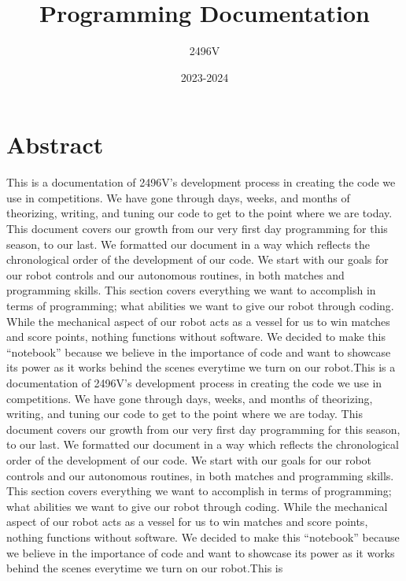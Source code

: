 \documentclass{article}
\title{\textbf{Programming Documentation}}
\author{2496V}
\date{2023-2024}
\begin{document}
\maketitle

\newpage
\renewcommand*\contentsname{Table of Contents}
\tableofcontents

\twocolumn \section{Abstract}
This is a documentation of 2496V’s development process in creating the code we use in competitions. We have gone through days, weeks, and months of theorizing, writing, and tuning our code to get to the point where we are today. This document covers our growth from our very first day programming for this season, to our last. We formatted our document in a way which reflects the chronological order of the development of our code. We start with our goals for our robot controls and our autonomous routines, in both matches and programming skills. This section covers everything we want to accomplish in terms of programming; what abilities we want to give our robot through coding. While the mechanical aspect of our robot acts as a vessel for us to win matches and score points, nothing functions without software. We decided to make this “notebook” because we believe in the importance of code and want to showcase its power as it works behind the scenes everytime we turn on our robot.This is a documentation of 2496V’s development process in creating the code we use in competitions. We have gone through days, weeks, and months of theorizing, writing, and tuning our code to get to the point where we are today. This document covers our growth from our very first day programming for this season, to our last. We formatted our document in a way which reflects the chronological order of the development of our code. We start with our goals for our robot controls and our autonomous routines, in both matches and programming skills. This section covers everything we want to accomplish in terms of programming; what abilities we want to give our robot through coding. While the mechanical aspect of our robot acts as a vessel for us to win matches and score points, nothing functions without software. We decided to make this “notebook” because we believe in the importance of code and want to showcase its power as it works behind the scenes everytime we turn on our robot.This is\\


\onecolumn
\end{document}
